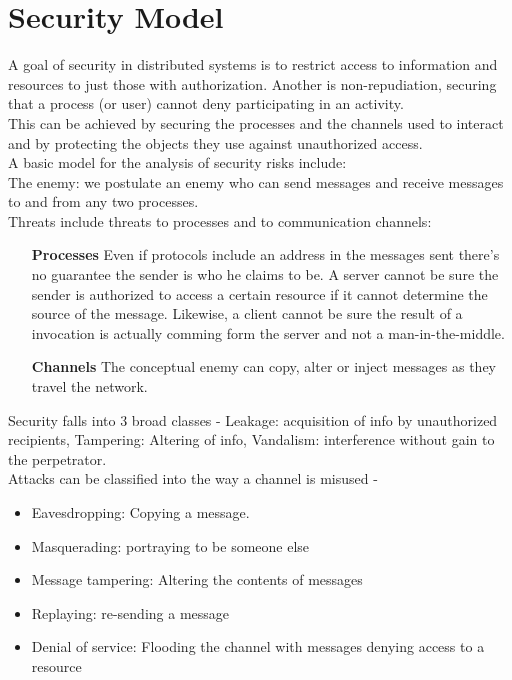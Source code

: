 \section{Security Model}
\label{securitymodel}


A goal of security in distributed systems is to restrict access to information and resources to just those with authorization. Another is non-repudiation, securing that a process (or user) cannot deny participating in an activity. \\

This can be achieved by securing the processes and the channels used to interact and by protecting the objects they use against unauthorized access.\\

A basic model for the analysis of security risks include: \\

The enemy: we postulate an enemy who can send messages and receive messages 
to and from any two processes. \\

Threats include threats to processes and to communication channels: \\

\begin{itemize}
\item[\textbf{Processes}] Even if protocols include an address in the messages sent there's no guarantee the sender is who he claims to be. A server cannot be sure the sender is authorized to access a certain resource if it cannot determine the source of the message. Likewise, a client cannot be sure the result of a invocation is actually comming form the server and not a man-in-the-middle.  
\item[\textbf{Channels}] The conceptual enemy can copy, alter or inject messages as they travel the network.
\end{itemize}

Security falls into 3 broad classes - Leakage: acquisition of info by unauthorized recipients, Tampering: Altering of info, Vandalism: interference without gain to the perpetrator.\\

Attacks can be classified into the way a channel is misused -
\begin{itemize}
\item Eavesdropping: Copying a message. 
\item Masquerading: portraying to be someone else
\item Message tampering: Altering the contents of messages
\item Replaying: re-sending a message
\item Denial of service: Flooding the channel with messages denying access to a resource
\end{itemize}

